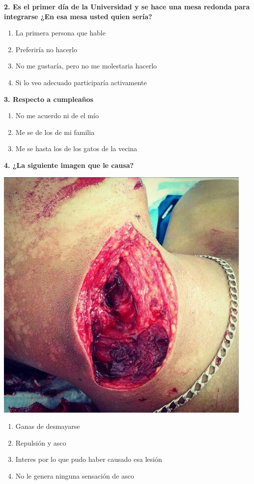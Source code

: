 \documentclass{article}
\begin{document}
\textbf{ 2. Es el primer día de la Universidad y se hace una mesa redonda para integrarse ¿En esa mesa usted quien sería?}
\begin{enumerate}[label=(\Alph*)] 
\item La primera persona que hable
\item Preferiría no hacerlo
\item No me gustaría, pero no me molestaria hacerlo
\item Si lo veo adecuado participaría activamente
\end{enumerate}




\textbf{3. Respecto a cumpleaños}
\begin{enumerate}[label=(\Alph*)]
\item No me acuerdo ni de el mío
\item Me se de los de mi familia
\item Me se hasta los de los gatos de la vecina
 \end{enumerate}
\pagebreak
\textbf{4. ¿La siguiente imagen que le causa?} \\
\begin{multicols}{2}
 \includegraphics[scale=0.3]{foto.jpg}
 \columnbreak
\begin{enumerate}[label=(\Alph*)] 
\item Ganas de desmayarse
\item Repulsión y asco
\item Interes por lo que pudo haber causado esa lesión
\item No le genera ninguna sensación de asco
\end{enumerate}
\end{multicols}
\end{document}
